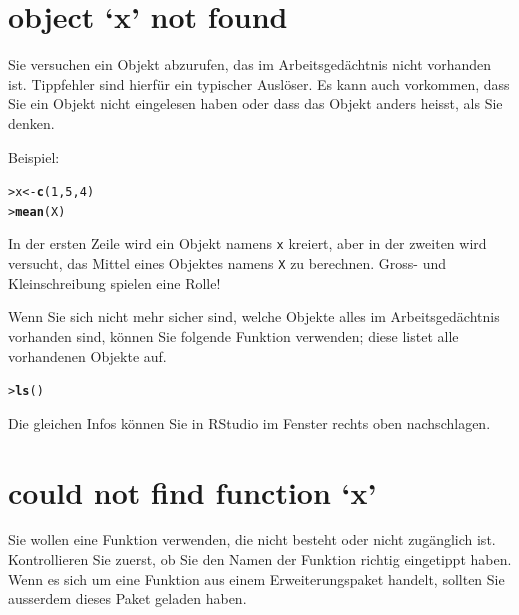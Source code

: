 \documentclass[oneside, 10pt]{book}\usepackage[]{graphicx}\usepackage[]{xcolor}
\makeatletter
\newcommand{\hlnum}[1]{\textcolor[rgb]{0.686,0.059,0.569}{#1}}%
\newcommand{\hlstd}[1]{\textcolor[rgb]{0.345,0.345,0.345}{#1}}%
\newcommand{\hlkwb}[1]{\textcolor[rgb]{0.69,0.353,0.396}{#1}}%
\newcommand{\hlkwd}[1]{\textcolor[rgb]{0.737,0.353,0.396}{\textbf{#1}}}%
\newenvironment{kframe}{%
 \def\at@end@of@kframe{}%
 \ifinner\ifhmode%
  \def\at@end@of@kframe{\end{minipage}}%
  \begin{minipage}{\columnwidth}%
 \fi\fi%
 \def\FrameCommand##1{\hskip\@totalleftmargin \hskip-\fboxsep
 \colorbox{shadecolor}{##1}\hskip-\fboxsep
     \hskip-\linewidth \hskip-\@totalleftmargin \hskip\columnwidth}%
 \MakeFramed {\advance\hsize-\width
   \@totalleftmargin\z@ \linewidth\hsize
   \@setminipage}}%
 {\par\unskip\endMakeFramed%
 \at@end@of@kframe}
\newenvironment{knitrout}{}{} %
\makeatother
\begin{document}
\section*{object `x' not found}
Sie versuchen ein Objekt abzurufen, das im Arbeitsgedächtnis
nicht vorhanden ist. Tippfehler sind hierfür ein typischer
Auslöser. Es kann auch vorkommen, dass Sie ein Objekt nicht
eingelesen haben oder dass das Objekt anders heisst, als Sie denken.

Beispiel:
\begin{knitrout}
\color{fgcolor}\begin{kframe}
\begin{alltt}
\hlstd{> }\hlstd{x} \hlkwb{<-} \hlkwd{c}\hlstd{(}\hlnum{1}\hlstd{,} \hlnum{5}\hlstd{,} \hlnum{4}\hlstd{)}
\hlstd{> }\hlkwd{mean}\hlstd{(X)}
\end{alltt}


{\ttfamily\noindent\bfseries\color{errorcolor}{Error in mean(X): object 'X' not found}}\end{kframe}
\end{knitrout}
In der ersten Zeile wird ein Objekt namens \texttt{x} kreiert,
aber in der zweiten wird versucht, das Mittel eines Objektes namens \texttt{X}
zu berechnen. Gross- und Kleinschreibung spielen eine Rolle!

Wenn Sie sich nicht mehr sicher sind, welche Objekte alles im
Arbeitsgedächtnis vorhanden sind, können Sie folgende Funktion
verwenden; diese listet alle vorhandenen Objekte auf.

\begin{knitrout}
\color{fgcolor}\begin{kframe}
\begin{alltt}
\hlstd{> }\hlkwd{ls}\hlstd{()}
\end{alltt}
\end{kframe}
\end{knitrout}

Die gleichen Infos können Sie in RStudio im Fenster
rechts oben nachschlagen.

\section*{could not find function `x'}
Sie wollen eine Funktion verwenden, die nicht besteht
oder nicht zugänglich ist. Kontrollieren Sie zuerst,
ob Sie den Namen der Funktion richtig eingetippt haben.
Wenn es sich um eine Funktion aus einem Erweiterungspaket
handelt, sollten Sie ausserdem dieses Paket geladen haben.
\end{document}
